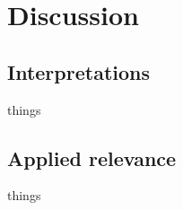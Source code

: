 \chapter{Discussion}
    \section{Interpretations}
        things
    \section{Applied relevance}
        things
    